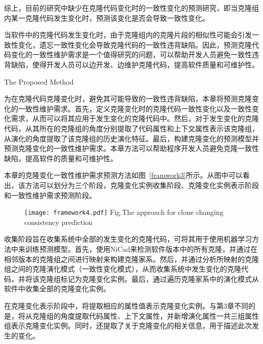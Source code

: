 综上，目前的研究中缺少在克隆代码变化时的一致性变化的预测研究，即当克隆组内某一克隆代码发生变化时，预测该变化是否会导致一致性变化。

当软件中的克隆代码发生变化时，由于克隆组内的克隆片段的相似性可能会引发一致性变化，遗忘一致性变化会导致克隆代码的一致性违背缺陷。因此，预测克隆代码变化的一致性维护需求是一个值得研究的问题，可以帮助开发人员避免一致性违背缺陷，使得开发人员可以边开发、边维护克隆代码，提高软件质量和可维护性。

{The Proposed Method}

为在克隆代码克隆变化时，避免其可能导致的一致性违背缺陷，本章将预测克隆变化的一致性维护需求。首先，定义克隆变化时的克隆代码一致性变化以及一致性变化需求，从而可以将其应用于发生变化的克隆代码中。然后，对于发生变化的克隆代码，从其所在的克隆组的角度分别提取了代码属性和上下文属性表示该克隆组，从演化的角度提取了该克隆组的历史演化特征。最后，构建克隆变化的预测模型并预测克隆变化的一致性维护需求。本章方法可以帮助程序开发人员避免克隆一致性缺陷，提高软件的质量和可维护性。

本章的克隆变化一致性维护需求预测方法如图~\ref{framwork3}所示。从图中可以看出，该方法可以划分为三个阶段，克隆变化实例收集阶段、克隆变化实例表示阶段和一致性维护需求预测阶段。

\begin{figure}[htbp]
\centering
\texttt{[image: framework4.pdf]}
{Fig.$\!$}{The approach for clone changing consistency prediction}
\vspace{-1em}
\end{figure}

收集阶段旨在收集系统中全部的发生变化的克隆代码，可将其用于使用机器学习方法中来训练预测模型。首先，使用NiCad来检测软件版本中的所有克隆，并通过在相邻版本的克隆组之间进行映射来构建克隆家系。然后，并通过分析所映射的克隆组之间的克隆演化模式（一致性变化模式），从而收集系统中发生变化的克隆代码，并将该克隆组标记为克隆变化实例。最后，通过遍历克隆家系中的演化模式从软件中收集全部的克隆变化实例。

在克隆变化表示阶段中，将提取相应的属性值表示克隆变化实例。与第3章不同的是，将从克隆组的角度提取代码属性、上下文属性，并新增演化属性一共三组属性组表示克隆变化实例。同时，还提取了关于克隆变化的相关信息，用于描述此次发生的变化。

